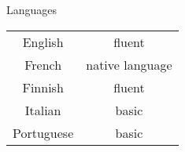 \begin{rubric}{Languages}
  \begin{tabular}{cc}
      English & fluent \\
      French &  native language \\
      Finnish &  fluent \\
      Italian & basic \\
      Portuguese & basic
  \end{tabular}
\end{rubric}
